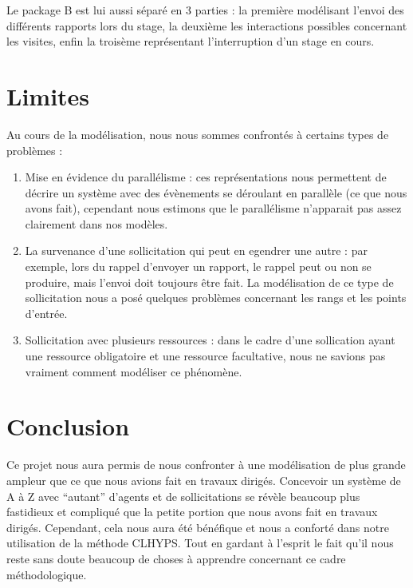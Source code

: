 \documentclass[12pt,a4paper]{article}
\begin{document}
Le package B est lui aussi séparé en 3 parties : la première modélisant l'envoi
des différents rapports lors du stage, la deuxième les interactions possibles
concernant les visites, enfin la troisème représentant l'interruption d'un stage
en cours.

{
    \newpage {} 
    
    \restoregeometry {} \newpage
}

{
    \newpage {} 
    
    \restoregeometry {} \newpage
}

{
    \newpage {} 
    
    \restoregeometry {} \newpage
}

\section{Limites}

Au cours de la modélisation, nous nous sommes confrontés à certains types de
problèmes :
\begin{enumerate}
    \item Mise en évidence du parallélisme : ces représentations nous permettent
        de décrire un système avec des évènements se déroulant en parallèle (ce
        que nous avons fait), cependant nous estimons que le parallélisme
        n'apparait pas assez clairement dans nos modèles.
    \item La survenance d'une sollicitation qui peut en egendrer une autre : par
        exemple, lors du rappel d'envoyer un rapport, le rappel peut ou non se
        produire, mais l'envoi doit toujours être fait. La modélisation de ce
        type de sollicitation nous a posé quelques problèmes concernant les
        rangs et les points d'entrée.
    \item Sollicitation avec plusieurs ressources : dans le cadre d'une
        sollication ayant une ressource obligatoire et une ressource
        facultative, nous ne savions pas vraiment comment modéliser ce
        phénomène.
\end{enumerate}

\section{Conclusion}

Ce projet nous aura permis de nous confronter à une modélisation de plus grande
ampleur que ce que nous avions fait en travaux dirigés. Concevoir un système de
A à Z avec \enquote{autant} d'agents et de sollicitations se révèle beaucoup
plus fastidieux et compliqué que la petite portion que nous avons fait en
travaux dirigés. Cependant, cela nous aura été bénéfique et nous a conforté dans
notre utilisation de la méthode CLHYPS. Tout en gardant à l'esprit le fait qu'il
nous reste sans doute beaucoup de choses à apprendre concernant ce cadre
méthodologique.
\end{document}
